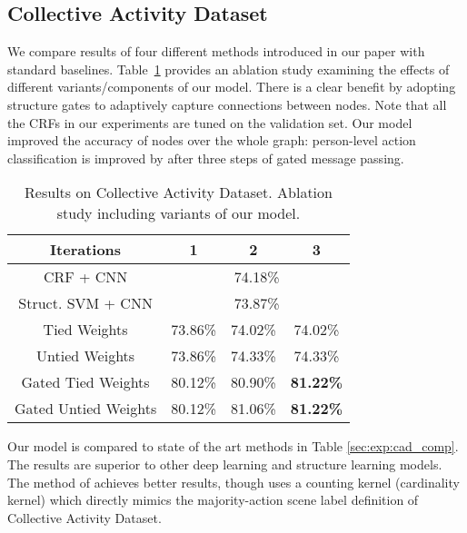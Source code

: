 \documentclass[10pt,twocolumn,letterpaper]{article}
\begin{document}
\subsection{Collective Activity Dataset}
\vspace{-1mm}

We compare results of four different methods introduced in our paper with standard baselines. Table~\ref{sec:exp:cad} provides an ablation study examining the effects of different variants/components of our model.
There is a clear benefit by adopting structure gates to adaptively capture connections between nodes. Note that all the CRFs in our experiments are tuned on the validation set. Our model improved the accuracy of nodes over the whole graph: person-level action classification is improved by  after three steps of gated message passing.

\begin{table}
\begin{tabular}{|c|c|c|c|}
\hline
Iterations & 1 & 2 & 3\\
\hline
\hline
CRF + CNN & \multicolumn{3}{|c|}{74.18\%} \\
\hline
Struct. SVM + CNN & \multicolumn{3}{|c|}{73.87\%} \\
\hline
Tied Weights & 73.86\% & 74.02\% & 74.02\%\\
\hline
Untied Weights & 73.86\% &  74.33\% & 74.33\%\\
\hline
Gated Tied Weights & 80.12\% &  80.90\%  & \bf 81.22\% \\
\hline
Gated Untied Weights & 80.12\% &  81.06\% & \bf 81.22\%  \\
\hline
\end{tabular}
\caption{Results on Collective Activity Dataset.  Ablation study including variants of our model.}
\label{sec:exp:cad}
\vspace{-1mm}
\end{table}

Our model is compared to state of the art methods in Table \ref{sec:exp:cad_comp}.  The results are superior to other deep learning and structure learning models. The method of \cite{HajimirsadeghiMcvpr15} achieves better results, though uses a counting kernel (cardinality kernel) which directly mimics the majority-action scene label definition of Collective Activity Dataset.
\end{document}
